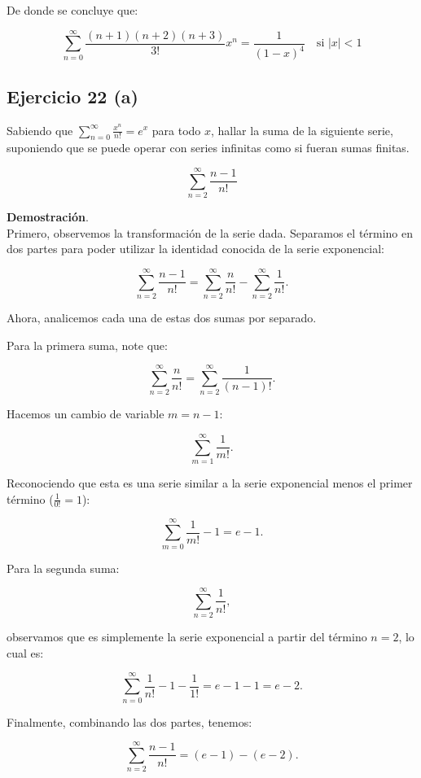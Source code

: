 \documentclass{article}
\begin{document}
    De donde se concluye que:

    $$
    \sum_{n=0}^{\infty} \frac{(n+1)(n+2)(n+3)}{3!} x^{n}=\frac{1}{(1-x)^{4}} \quad \text {si } |x|<1
    $$

    \subsection*{Ejercicio 22 (a)}

    Sabiendo que $\sum_{n=0}^{\infty} \frac{x^{n}}{n!}=e^{x}$ para todo $x$, hallar la suma de la siguiente serie, suponiendo que se puede operar con series infinitas como si fueran sumas finitas.

    $$
    \sum_{n=2}^{\infty} \frac{n-1}{n!}
    $$

    \textbf{Demostración}.\\

    Primero, observemos la transformación de la serie dada. Separamos el término en dos partes para poder utilizar la identidad conocida de la serie exponencial:

    $$
    \sum_{n=2}^{\infty} \frac{n-1}{n!} = \sum_{n=2}^{\infty} \frac{n}{n!} - \sum_{n=2}^{\infty} \frac{1}{n!}.
    $$

    Ahora, analicemos cada una de estas dos sumas por separado.

    Para la primera suma, note que:

    $$
    \sum_{n=2}^{\infty} \frac{n}{n!} = \sum_{n=2}^{\infty} \frac{1}{(n-1)!}.
    $$

    Hacemos un cambio de variable $m = n - 1$:

    $$
    \sum_{m=1}^{\infty} \frac{1}{m!}.
    $$

    Reconociendo que esta es una serie similar a la serie exponencial menos el primer término ($\frac{1}{0!} = 1$):

    $$
    \sum_{m=0}^{\infty} \frac{1}{m!} - 1 = e - 1.
    $$

    Para la segunda suma:

    $$
    \sum_{n=2}^{\infty} \frac{1}{n!},
    $$

    observamos que es simplemente la serie exponencial a partir del término $n=2$, lo cual es:

    $$
    \sum_{n=0}^{\infty} \frac{1}{n!} - 1 - \frac{1}{1!} = e - 1 - 1 = e - 2.
    $$

    Finalmente, combinando las dos partes, tenemos:

    $$
    \sum_{n=2}^{\infty} \frac{n-1}{n!} = (e - 1) - (e - 2).
    $$
\end{document}
